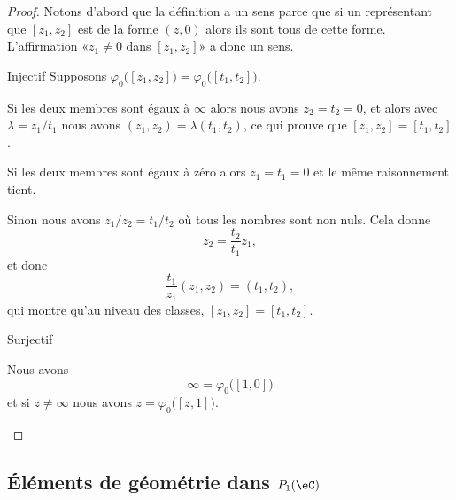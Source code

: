 \begin{proof}
    Notons d'abord que la définition a un sens parce que si un représentant que \( [z_1,z_2]\) est de la forme \( (z,0)\) alors ils sont tous de cette forme. L'affirmation «\( z_1\neq 0\) dans \( [z_1,z_2]\)» a donc un sens.
    \begin{subproof}
        \item[Injectif]
            Supposons \( \varphi_0\big( [z_1,z_2] \big)=\varphi_0\big( [t_1,t_2] \big)\). 
            
            Si les deux membres sont égaux à \( \infty\) alors nous avons \( z_2=t_2=0\), et alors avec \( \lambda=z_1/t_1\) nous avons \( (z_1,z_2)=\lambda (t_1,t_2)\), ce qui prouve que \( [z_1,z_2]=[t_1,t_2]\).

            Si les deux membres sont égaux à zéro alors \( z_1=t_1=0\) et le même raisonnement tient.

            Sinon nous avons \( z_1/z_2=t_1/t_2\) où tous les nombres sont non nuls. Cela donne 
            \begin{equation}
                z_2=\frac{ t_2 }{ t_1 }z_1,
            \end{equation}
            et donc
            \begin{equation}
                \frac{ t_1 }{ z_1 }(z_1,z_2)=(t_1,t_2),
            \end{equation}
            qui montre qu'au niveau des classes, \( [z_1,z_2]=[t_1,t_2]\).

        \item[Surjectif]

            Nous avons
            \begin{equation}
                \infty=\varphi_0\big( [1,0] \big)
            \end{equation}
            et si \( z\neq \infty\) nous avons \( z=\varphi_0\big( [z,1] \big)\).
    \end{subproof}
\end{proof}

\subsection{Éléments de géométrie dans \( P_1(\eC)\)}
\label{SUBSECooQPRLooAjMNqp}

